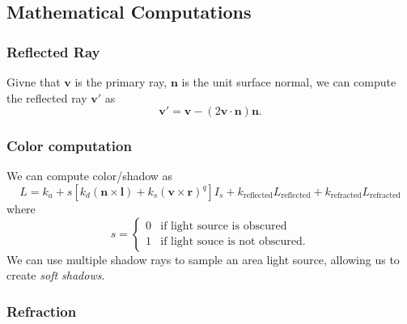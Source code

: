 \documentclass[twocolumn,landscape,10pt]{article}
\theoremstyle{definition}
\begin{document}
\subsection{Mathematical Computations}

\subsubsection{Reflected Ray}

Givne that $\mathbf{v}$ is the primary ray, $\mathbf{n}$ is the unit surface
normal, we can compute the reflected ray $\mathbf{v}'$ as
\[
    \mathbf{v}'=\mathbf{v}-(2\mathbf{v}\cdot\mathbf{n})\mathbf{n}.
\]

\subsubsection{Color computation}

We can compute color/shadow as
\[
    L = k_a+s\left[k_d(\mathbf{n}\times \mathbf{l})
    +k_s{(\mathbf{v}\times \mathbf{r})}^{q}\right]I_s
    +k_\text{reflected}L_\text{reflected}+k_\text{refracted}L_\text{refracted}
\]
where
\[
    s =
    \begin{cases}
        0 & \text{if light source is obscured} \\
        1 & \text{if light souce is not obscured}.
    \end{cases} 
\]
We can use multiple shadow rays to sample an area light source, allowing us to
create \emph{soft shadows}.

\subsubsection{Refraction}
\end{document}
